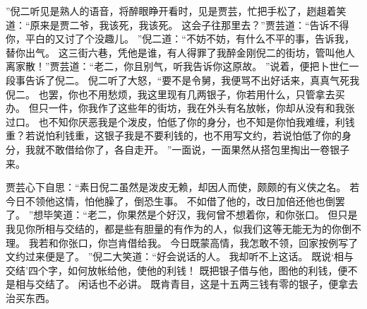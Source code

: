 ”倪二听见是熟人的语音，将醉眼睁开看时，见是贾芸，忙把手松了，趔趄着笑道：“原来是贾二爷，我该死，我该死。
这会子往那里去？”贾芸道：“告诉不得你，平白的又讨了个没趣儿。
”倪二道：“不妨不妨，有什么不平的事，告诉我，替你出气。
这三街六巷，凭他是谁，有人得罪了我醉金刚倪二的街坊，管叫他人离家散！”贾芸道：“老二，你且别气，听我告诉你这原故。
”说着，便把卜世仁一段事告诉了倪二。
倪二听了大怒，“要不是令舅，我便骂不出好话来，真真气死我倪二。
也罢，你也不用愁烦，我这里现有几两银子，你若用什么，只管拿去买办。
但只一件，你我作了这些年的街坊，我在外头有名放帐，你却从没有和我张过口。
也不知你厌恶我是个泼皮，怕低了你的身分，也不知是你怕我难缠，利钱重？若说怕利钱重，这银子我是不要利钱的，也不用写文约，若说怕低了你的身分，我就不敢借给你了，各自走开。
”一面说，一面果然从搭包里掏出一卷银子来。
\par
贾芸心下自思：“素日倪二虽然是泼皮无赖，却因人而使，颇颇的有义侠之名。
若今日不领他这情，怕他臊了，倒恐生事。
不如借了他的，改日加倍还他也倒罢了。
”想毕笑道：“老二，你果然是个好汉，我何曾不想着你，和你张口。
但只是我见你所相与交结的，都是些有胆量的有作为的人，似我们这等无能无为的你倒不理。
我若和你张口，你岂肯借给我。
今日既蒙高情，我怎敢不领，回家按例写了文约过来便是了。
”倪二大笑道：“好会说话的人。
我却听不上这话。
既说‘相与交结’四个字，如何放帐给他，使他的利钱！
既把银子借与他，图他的利钱，便不是相与交结了。
闲话也不必讲。
既肯青目，这是十五两三钱有零的银子，便拿去治买东西。
